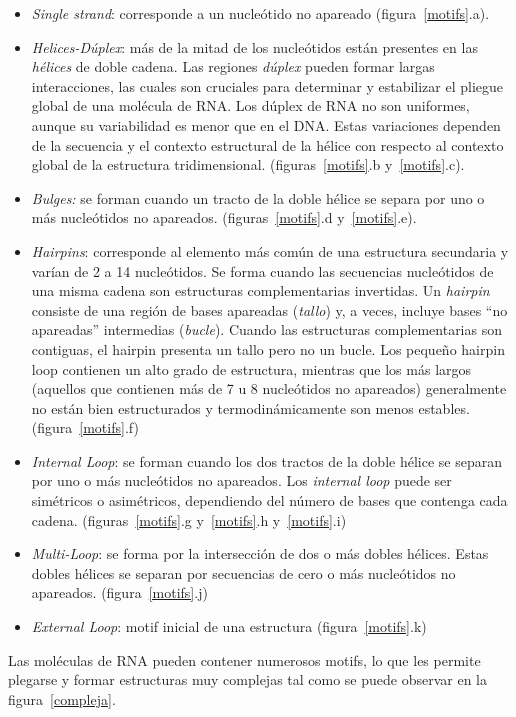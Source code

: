 \begin{itemize}

\item \emph{Single strand}: corresponde a un nucleótido no apareado (figura~\ref{motifs}.a).

\item \emph{Helices-Dúplex}: más de la mitad de los nucleótidos están presentes en las \emph{hélices} de doble cadena. Las regiones \emph{dúplex} pueden formar largas interacciones, las cuales son cruciales para determinar y estabilizar el pliegue global de una molécula de RNA. Los dúplex de RNA no son uniformes, aunque su variabilidad es menor que en el DNA. Estas variaciones dependen de la secuencia y el contexto estructural de la hélice con respecto al contexto global de la estructura tridimensional. (figuras~\ref{motifs}.b y~\ref{motifs}.c).

\item \emph{Bulges:} se forman cuando un tracto de la doble hélice se separa por uno o más nucleótidos no apareados. (figuras~\ref{motifs}.d y~\ref{motifs}.e).

\item \emph{Hairpins}: corresponde al elemento más común de una estructura secundaria y varían de 2 a 14 nucleótidos. Se forma cuando las secuencias nucleótidos de una misma cadena son estructuras complementarias invertidas.
Un \emph{hairpin} consiste de una región de bases apareadas (\emph{tallo}) y, a veces, incluye bases ``no apareadas'' intermedias (\emph{bucle}). Cuando las estructuras complementarias son contiguas, el hairpin presenta un tallo pero no un bucle. Los pequeño hairpin loop contienen un alto grado de estructura, mientras que los más largos (aquellos que contienen más de 7 u 8 nucleótidos no apareados) generalmente no están bien estructurados y termodinámicamente son menos estables. (figura~\ref{motifs}.f)
    
\item \emph{Internal Loop}: se forman cuando los dos tractos de la doble hélice se separan por uno o más nucleótidos no apareados. Los \emph{internal loop} puede ser simétricos o asimétricos, dependiendo del número de bases que contenga cada cadena. (figuras~\ref{motifs}.g y~\ref{motifs}.h y~\ref{motifs}.i)

\item \emph{Multi-Loop}: se forma por la intersección de dos o más dobles hélices. Estas dobles hélices se separan por secuencias de cero o más nucleótidos no apareados. (figura~\ref{motifs}.j)

\item \emph{External Loop}: motif inicial de una estructura (figura~\ref{motifs}.k) 

\end{itemize}
\par Las moléculas de RNA pueden contener numerosos motifs, lo que les permite plegarse y formar estructuras muy complejas tal como se puede observar en la figura~\ref{compleja}.

